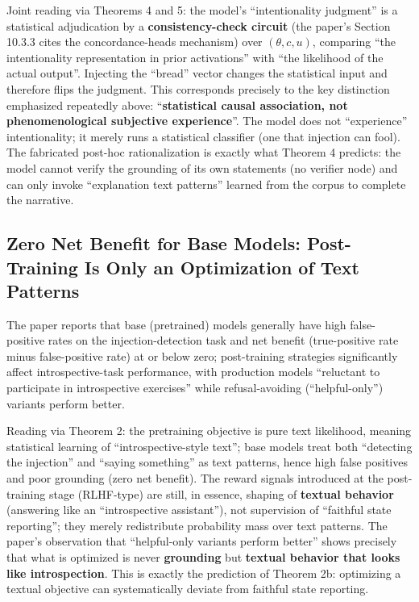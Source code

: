 Joint reading via Theorems 4 and 5: the model's ``intentionality judgment'' is a statistical
adjudication by a \textbf{consistency-check circuit} (the paper's Section 10.3.3 cites the
concordance-heads mechanism\cite{kamath-2025-concordance}) over $(\theta, c, u)$, comparing
``the intentionality representation in prior activations'' with ``the likelihood of the actual
output''. Injecting the ``bread'' vector changes the statistical input and therefore flips the
judgment. This corresponds precisely to the key distinction emphasized repeatedly
above: ``\textbf{statistical causal association, not phenomenological subjective
experience}''. The model does not ``experience'' intentionality; it merely runs a statistical
classifier (one that injection can fool). The fabricated post-hoc rationalization is exactly
what Theorem 4 predicts: the model cannot verify the grounding of its own statements (no
verifier node) and can only invoke ``explanation text patterns'' learned from the corpus to
complete the narrative.

\subsection{Zero Net Benefit for Base Models: Post-Training Is Only an Optimization of Text Patterns}

The paper reports that base (pretrained) models generally have high false-positive rates on
the injection-detection task and net benefit (true-positive rate minus false-positive rate)
at or below zero; post-training strategies significantly affect introspective-task
performance, with production models ``reluctant to participate in introspective exercises''
while refusal-avoiding (``helpful-only'') variants perform better\cite{lindsey-2026-introspection}.

Reading via Theorem 2: the pretraining objective is pure text likelihood, meaning statistical
learning of ``introspective-style text''; base models treat both ``detecting the injection'' and
``saying something'' as text patterns, hence high false positives and poor grounding (zero net
benefit). The reward signals introduced at the post-training stage (RLHF-type) are still, in
essence, shaping of \textbf{textual behavior} (answering like an ``introspective assistant''),
not supervision of ``faithful state reporting''; they merely redistribute probability mass
over text patterns. The paper's observation that ``helpful-only variants perform better''
shows precisely that what is optimized is never \textbf{grounding} but \textbf{textual
behavior that looks like introspection}. This is exactly the prediction of Theorem 2b:
optimizing a textual objective can systematically deviate from faithful state reporting.

